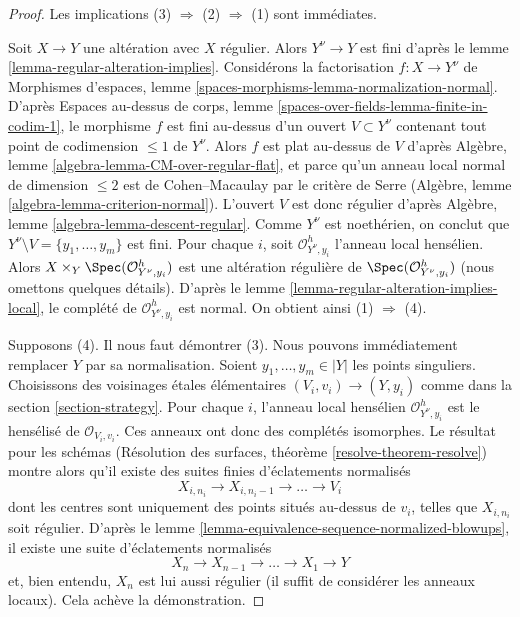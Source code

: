 \begin{proof}
Les implications (3) $\Rightarrow$ (2) $\Rightarrow$ (1) sont immédiates.

\medskip\noindent
Soit $X \to Y$ une altération avec $X$ régulier. Alors $Y^\nu \to Y$ est
fini d'après le lemme \ref{lemma-regular-alteration-implies}.
Considérons la factorisation $f : X \to Y^\nu$ de
Morphismes d'espaces, lemme \ref{spaces-morphisms-lemma-normalization-normal}.
D'après Espaces au-dessus de corps, lemme
\ref{spaces-over-fields-lemma-finite-in-codim-1}, le morphisme $f$ est fini
au-dessus d'un ouvert $V \subset Y^\nu$ contenant tout point de codimension
$\leq 1$ de $Y^\nu$. Alors $f$ est plat au-dessus de $V$ d'après
Algèbre, lemme \ref{algebra-lemma-CM-over-regular-flat}, et parce qu'un anneau
local normal de dimension $\leq 2$ est de Cohen--Macaulay par le critère de
Serre (Algèbre, lemme \ref{algebra-lemma-criterion-normal}).
L'ouvert $V$ est donc régulier d'après Algèbre, lemme
\ref{algebra-lemma-descent-regular}.
Comme $Y^\nu$ est noethérien, on conclut que
$Y^\nu \setminus V = \{y_1, \ldots, y_m\}$ est fini.
Pour chaque $i$, soit $\mathcal{O}_{Y^\nu, y_i}^h$ l'anneau local hensélien.
Alors $X \times_Y \Spec(\mathcal{O}_{Y^\nu, y_i}^h)$ est une altération
régulière de $\Spec(\mathcal{O}_{Y^\nu, y_i}^h)$
(nous omettons quelques détails).
D'après le lemme \ref{lemma-regular-alteration-implies-local}, le complété de
$\mathcal{O}_{Y^\nu, y_i}^h$ est normal. On obtient ainsi
(1) $\Rightarrow$ (4).

\medskip\noindent
Supposons (4). Il nous faut démontrer (3). Nous pouvons immédiatement
remplacer $Y$ par sa normalisation. Soient
$y_1, \ldots, y_m \in |Y|$ les points singuliers. Choisissons des voisinages
étales élémentaires $(V_i, v_i) \to (Y, y_i)$ comme dans la section
\ref{section-strategy}. Pour chaque $i$, l'anneau local hensélien
$\mathcal{O}_{Y^\nu, y_i}^h$ est le hensélisé de
$\mathcal{O}_{V_i, v_i}$. Ces anneaux ont donc des complétés isomorphes.
Le résultat pour les schémas (Résolution des surfaces, théorème
\ref{resolve-theorem-resolve}) montre alors qu'il existe des suites finies
d'éclatements normalisés
$$
X_{i, n_i} \to X_{i, n_i - 1} \to \ldots \to V_i
$$
dont les centres sont uniquement des points situés au-dessus de $v_i$, telles
que $X_{i, n_i}$ soit régulier. D'après le lemme
\ref{lemma-equivalence-sequence-normalized-blowups}, il existe une suite
d'éclatements normalisés
$$
X_n \to X_{n - 1} \to \ldots \to X_1 \to Y
$$
et, bien entendu, $X_n$ est lui aussi régulier (il suffit de considérer les
anneaux locaux). Cela achève la démonstration.
\end{proof}
















